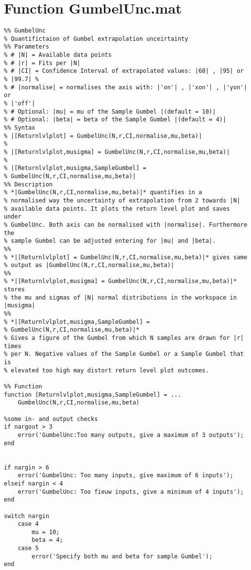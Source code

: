 \chapter{Function GumbelUnc.mat}

\begin{lstlisting}
%% GumbelUnc
% Quantifictaion of Gumbel extrapolation unceirtainty
%% Parameters
% # |N| = Available data points 
% # |r| = Fits per |N|
% # |CI| = Confidence Interval of extrapolated values: |68| , |95| or
% |99.7| %
% # |normalise| = normalises the axis with: |'on'| , |'xon'| , |'yon'| or
% |'off'|
% # Optional: |mu| = mu of the Sample Gumbel |(default = 10)|
% # Optional: |beta| = beta of the Sample Gumbel |(default = 4)|
%% Syntax
% |[Returnlvlplot] = GumbelUnc(N,r,CI,normalise,mu,beta)|
% 
% |[Returnlvlplot,musigma] = GumbelUnc(N,r,CI,normalise,mu,beta)| 
% 
% |[Returnlvlplot,musigma,SampleGumbel] =
% GumbelUnc(N,r,CI,normalise,mu,beta)|
%% Description
% *|GumbelUnc(N,r,CI,normalise,mu,beta)|* quantifies in a 
% normalised way the uncertainty of extrapolation from 2 towards |N|
% available data points. It plots the return level plot and saves under
% GumbelUnc. Both axis can be normalised with |normalise|. Furthermore the
% sample Gumbel can be adjusted entering for |mu| and |beta|.
%%
% *|[Returnlvlplot] = GumbelUnc(N,r,CI,normalise,mu,beta)|* gives same 
% output as |GumbelUnc(N,r,CI,normalise,mu,beta)|
%%
% *|[Returnlvlplot,musigma] = GumbelUnc(N,r,CI,normalise,mu,beta)|* stores
% the mu and sigmas of |N| normal distributions in the workspace in |musigma|
%%
% *|[Returnlvlplot,musigma,SampleGumbel] =
% GumbelUnc(N,r,CI,normalise,mu,beta)|*
% Gives a figure of the Gumbel from which N samples are drawn for |r| times
% per N. Negative values of the Sample Gumbel or a Sample Gumbel that is
% elevated too high may distort return level plot outcomes. 

%% Function
function [Returnlvlplot,musigma,SampleGumbel] = ...
    GumbelUnc(N,r,CI,normalise,mu,beta)

%some in- and output checks
if nargout > 3
    error('GumbelUnc:Too many outputs, give a maximum of 3 outputs');
end
        

if nargin > 6
    error('GumbelUnc: Too many inputs, give maximum of 6 inputs');
elseif nargin < 4
    error('GumbelUnc: Too fieuw inputs, give a minimum of 4 inputs');
end

switch nargin
    case 4
        mu = 10;
        beta = 4;
    case 5
        error('Specify both mu and beta for sample Gumbel');
end


\end{lstlisting}
